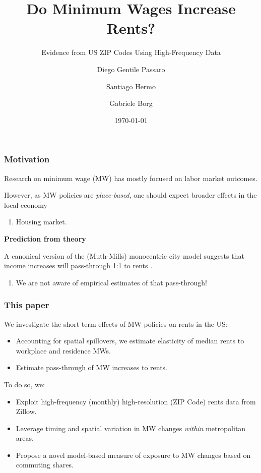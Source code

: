 \documentclass[aspectratio=169, t]{beamer}
\title{Do Minimum Wages Increase Rents?}
\subtitle{Evidence from US ZIP Codes Using High-Frequency Data}
\date{\today}
\author{Diego Gentile Passaro \and Santiago Hermo \and Gabriele Borg}
\institute{Brown University $ \quad\quad\quad\quad $ Brown University $ \quad\quad\quad\quad$  AWS}
\begin{document}
\maketitle



\begin{frame}
	\frametitle{Motivation}
	
	Research on minimum wage (MW) has mostly focused on labor market outcomes.
	
	\vspace{1.5mm}

	However, as MW policies are \textit{place-based}, one should expect broader effects 
	in the local economy
	\begin{enumerate}[$\Rightarrow $]
		\item Housing market.
	\end{enumerate}

	\pause
	\vspace{3mm}
	\textbf{Prediction from theory}
	
    A canonical version of the (Muth-Mills) monocentric city model suggests that income increases will 
    pass-through 1:1 to rents \parencite{Brueckner1987}.  
    \begin{enumerate}[$\Rightarrow $]
		\item We are not aware of empirical estimates of that pass-through!
	\end{enumerate}
\end{frame}

\begin{frame}
	\frametitle{This paper}
	We investigate the short term effects of MW policies on rents in the US:
	\begin{itemize}
		\vspace{.5mm} \item Accounting for spatial spillovers, we estimate 
		elasticity of median rents to workplace and residence MWs.
		\vspace{.5mm} \item Estimate pass-through of MW increases to rents.
	\end{itemize}
	
	\vspace{3mm}
	\pause
	To do so, we:
	\begin{itemize}
    	\vspace{.5mm} \item Exploit high-frequency (monthly) high-resolution 
    	(ZIP Code) rents data from Zillow.
    	\vspace{.5mm} \item Leverage timing and spatial variation in MW changes 
    	\textit{within} metropolitan areas.
    	\vspace{.5mm} \item Propose a novel model-based measure of exposure to MW 
		changes based on commuting shares.
	\end{itemize}
\end{frame}
\end{document}
